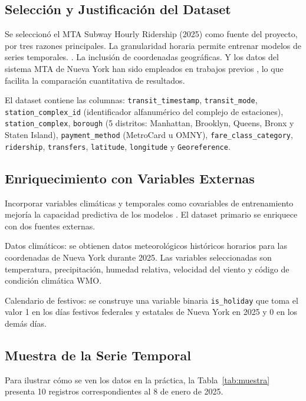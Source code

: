 \documentclass[preprint,12pt]{elsarticle}
\begin{document}
\subsection{Selección y Justificación del Dataset}

Se seleccionó el MTA Subway Hourly Ridership (2025) \cite{mta_hourly} como fuente del proyecto, por tres razones principales. La granularidad horaria permite entrenar modelos de series temporales. \cite{liyanage2022, ghandeharioun2023}. La inclusión de coordenadas geográficas. Y los datos del sistema MTA de Nueva York han sido empleados en trabajos previos \cite{ghandeharioun2023, wang2024}, lo que facilita la comparación cuantitativa de resultados.

El dataset contiene las columnas: \texttt{transit\_timestamp}, \texttt{transit\_mode}, \texttt{station\_complex\_id} (identificador alfanumérico del complejo de estaciones), \texttt{station\_complex}, \texttt{borough} (5 distritos: Manhattan, Brooklyn, Queens, Bronx y Staten Island), \texttt{payment\_method} (MetroCard u OMNY), \texttt{fare\_class\_category}, \texttt{ridership}, \texttt{transfers}, \texttt{latitude}, \texttt{longitude} y \texttt{Georeference}.

\subsection{Enriquecimiento con Variables Externas}

Incorporar variables climáticas y temporales como covariables de entrenamiento mejoría la capacidad predictiva de los modelos \cite{afandizadeh2024, liu2024}. El dataset primario se enriquece con dos fuentes externas.

Datos climáticos: se obtienen datos meteorológicos históricos horarios para las coordenadas de Nueva York durante 2025. Las variables seleccionadas son temperatura, precipitación, humedad relativa, velocidad del viento y código de condición climática WMO.

Calendario de festivos: se construye una variable binaria \texttt{is\_holiday} que toma el valor 1 en los días festivos federales y estatales de Nueva York en 2025 \cite{nyc_holidays_2025} y 0 en los demás días. 
\subsection{Muestra de la Serie Temporal}

Para ilustrar cómo se ven los datos en la práctica, la Tabla~\ref{tab:muestra} presenta 10 registros correspondientes al 8 de enero de 2025.
\end{document}
